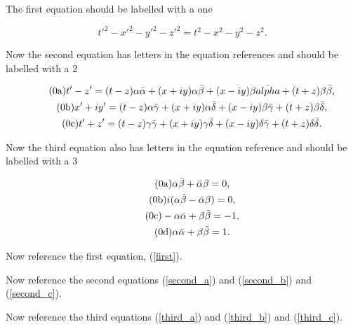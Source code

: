 \documentclass[floatfix,aps,prd,amsmath,amssymb]{revtex4}
\begin{document}
The first equation should be labelled with a one

\begin{equation}\label{first}  
{t'}^2 - {x'}^2 - {y'}^2 - {z'}^2 = {t}^2 - {x}^2 - {y}^2 - {z}^2.
\end{equation}

Now the second equation has letters in the equation references and should be labelled with a 2

\begin{subequations}
  \begin{gather}
    \label{second_a}\tag{{\theequation}a}
    t' - z'  = (t-z)\alpha\bar{\alpha} + (x + iy)\alpha\bar{\beta} + (x - iy)\beta\bar{alpha} + (t+z)\beta\bar{\beta},
    \\\label{second_b}\tag{{\theequation}b}
    x' + iy'  = (t-z)\alpha\bar{\gamma} + (x + iy)\alpha\bar{\delta} + (x-iy)\beta\bar{\gamma} + (t+z)\beta\bar{\delta},
    \\\label{second_c}\tag{{\theequation}c}
    t' + z'  = (t-z)\gamma\bar{\gamma} + (x + iy)\gamma\bar{\delta} + (x-iy)\delta\bar{\gamma} + (t+z)\delta\bar{\delta}.
  \end{gather}
\end{subequations}

Now the third equation also has letters in the equation reference and should be labelled with a 3

\begin{subequations}
\begin{gather}
\label{third_a}\tag{{\theequation}a}
\alpha \bar{\beta} + \bar{\alpha} \beta = 0, 
\\\label{third_b}\tag{{\theequation}b}
i (\alpha \bar{\beta} - \bar{\alpha} \beta) = 0, 
\\\label{third_c}\tag{{\theequation}c}
-\alpha \bar{\alpha} + \beta \bar{\beta} = -1, 
\\\label{third_d}\tag{{\theequation}d}
\alpha \bar{\alpha} + \beta \bar{\beta} = 1. 
\end{gather}
\end{subequations}

Now reference the first equation, (\ref{first}).

Now reference the second equations (\ref{second_a}) and (\ref{second_b}) and (\ref{second_c}).

Now reference the third equations (\ref{third_a}) and (\ref{third_b}) and (\ref{third_c}).
\end{document}
